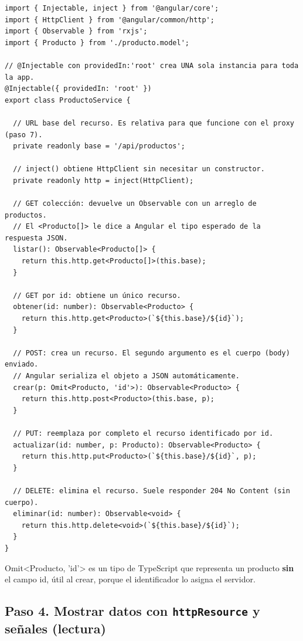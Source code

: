\documentclass[11pt,a4paper]{article}
\newcommand{\code}[1]{{\ttfamily\color{ngdark}#1}}
\begin{document}
\begin{lstlisting}[caption={\texttt{src/app/producto.service.ts} --- servicio con GET/POST/PUT/DELETE.},label={lst:servicio}]
import { Injectable, inject } from '@angular/core';
import { HttpClient } from '@angular/common/http';
import { Observable } from 'rxjs';
import { Producto } from './producto.model';

// @Injectable con providedIn:'root' crea UNA sola instancia para toda la app.
@Injectable({ providedIn: 'root' })
export class ProductoService {

  // URL base del recurso. Es relativa para que funcione con el proxy (paso 7).
  private readonly base = '/api/productos';

  // inject() obtiene HttpClient sin necesitar un constructor.
  private readonly http = inject(HttpClient);

  // GET colección: devuelve un Observable con un arreglo de productos.
  // El <Producto[]> le dice a Angular el tipo esperado de la respuesta JSON.
  listar(): Observable<Producto[]> {
    return this.http.get<Producto[]>(this.base);
  }

  // GET por id: obtiene un único recurso.
  obtener(id: number): Observable<Producto> {
    return this.http.get<Producto>(`${this.base}/${id}`);
  }

  // POST: crea un recurso. El segundo argumento es el cuerpo (body) enviado.
  // Angular serializa el objeto a JSON automáticamente.
  crear(p: Omit<Producto, 'id'>): Observable<Producto> {
    return this.http.post<Producto>(this.base, p);
  }

  // PUT: reemplaza por completo el recurso identificado por id.
  actualizar(id: number, p: Producto): Observable<Producto> {
    return this.http.put<Producto>(`${this.base}/${id}`, p);
  }

  // DELETE: elimina el recurso. Suele responder 204 No Content (sin cuerpo).
  eliminar(id: number): Observable<void> {
    return this.http.delete<void>(`${this.base}/${id}`);
  }
}
\end{lstlisting}

\begin{nota}
	\code{Omit<Producto, 'id'>} es un tipo de TypeScript que representa un producto \textbf{sin} el campo \code{id}, útil al crear, porque el identificador lo asigna el servidor.
\end{nota}

\subsection*{Paso 4. Mostrar datos con \texttt{httpResource} y señales (lectura)}
\end{document}
